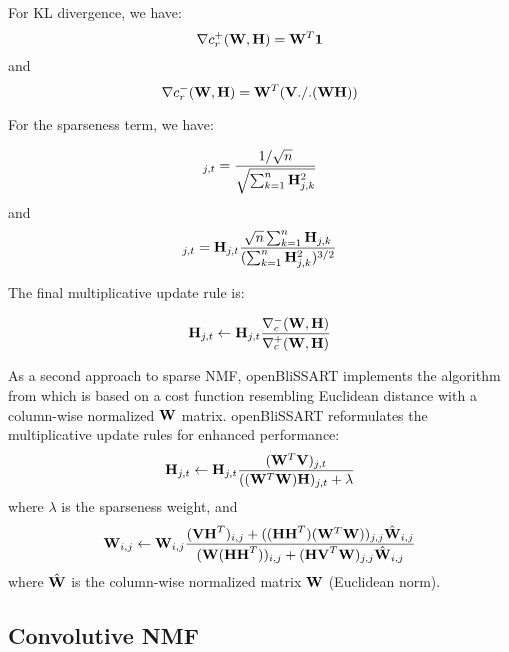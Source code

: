 For KL divergence, we have:
\begin{equation}
\nabla c_r^+(\mathbf{W},\mathbf{H}) = \mathbf{W}^T\mathbf{1}
\end{equation}
and
\begin{equation}
\nabla c_r^-(\mathbf{W},\mathbf{H}) = \mathbf{W}^T (\mathbf{V} ./. (\mathbf{WH}))
\end{equation}

For the sparseness term, we have:

\begin{equation}
[\nabla c_s^+(\mat{H})]_{j,t} = \frac{1 / \sqrt{n}}{\sqrt{\sum_{k=1}^n \mat{H}_{j,k}^2}}
\end{equation}
and
\begin{equation}
[\nabla c_s^-(\mat{H})]_{j,t} = \mat{H}_{j,t} \frac{\sqrt{n}\sum_{k=1}^n \mat{H}_{j,k}}{(\sum_{k=1}^n \mat{H}_{j,k}^2)^{3/2}}
\end{equation}

The final multiplicative update rule is:

\begin{equation}
\mathbf{H}_{j,t} \leftarrow \mathbf{H}_{j,t}\frac{\nabla_c^-(\mathbf{W},\mathbf{H})}{\nabla_c^+(\mathbf{W},\mathbf{H})}
\end{equation}


As a second approach to sparse NMF, openBliSSART implements the algorithm from
\cite{Eggert2004} which is based on a cost function resembling Euclidean
distance with a column-wise normalized $\mathbf{W}$ matrix. openBliSSART
reformulates the multiplicative update rules for enhanced performance:
\begin{equation}
\mathbf{H}_{j,t} \leftarrow \mathbf{H}_{j,t} 
    \frac{(\mathbf{W}^T \mathbf{V})_{j,t}}
         {((\mathbf{W}^T\mathbf{W})\mathbf{H})_{j,t} + \lambda}
\end{equation}
where $\lambda$ is the sparseness weight, and
\begin{equation}
\mathbf{W}_{i,j} \leftarrow \mathbf{W}_{i,j} 
    \frac{(\mathbf{VH}^T)_{i,j} + ((\mathbf{HH}^T)(\mathbf{W}^T\mathbf{W}))_{j,j} \hat{\mathbf{W}}_{i,j}}
         {(\mathbf{W}(\mathbf{HH}^T))_{i,j} + (\mathbf{HV}^T\mathbf{W})_{j,j} \hat{\mathbf{W}}_{i,j}}
\end{equation}
where $\hat{\mathbf{W}}$ is the column-wise normalized matrix $\mathbf{W}$ (Euclidean
norm).


\subsection{Convolutive NMF}

\label{sec:NMD}

